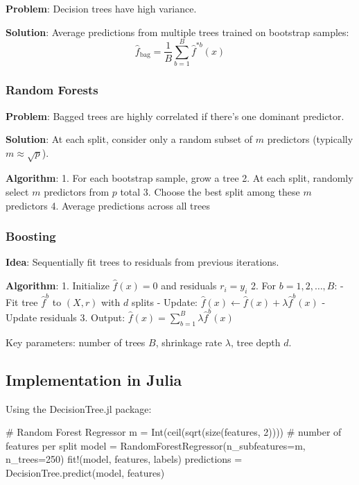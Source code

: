 \documentclass[
  letterpaper,
  DIV=11,
  numbers=noendperiod]{scrreprt}
\newenvironment{Shaded}{\begin{snugshade}}{\end{snugshade}}
\newcommand{\CommentTok}[1]{\textcolor[rgb]{0.37,0.37,0.37}{#1}}
\newcommand{\FloatTok}[1]{\textcolor[rgb]{0.68,0.00,0.00}{#1}}
\newcommand{\FunctionTok}[1]{\textcolor[rgb]{0.28,0.35,0.67}{#1}}
\newcommand{\NormalTok}[1]{\textcolor[rgb]{0.00,0.23,0.31}{#1}}
\newcommand{\OperatorTok}[1]{\textcolor[rgb]{0.37,0.37,0.37}{#1}}
\begin{document}
\textbf{Problem}: Decision trees have high variance.

\textbf{Solution}: Average predictions from multiple trees trained on
bootstrap samples: \[
\hat{f}_\text{bag} = \frac{1}{B} \sum_{b=1}^B \hat{f}^{*b}(x)
\]

\subsubsection{Random Forests}\label{random-forests}

\textbf{Problem}: Bagged trees are highly correlated if there's one
dominant predictor.

\textbf{Solution}: At each split, consider only a random subset of \(m\)
predictors (typically \(m \approx \sqrt{p}\)).

\textbf{Algorithm}: 1. For each bootstrap sample, grow a tree 2. At each
split, randomly select \(m\) predictors from \(p\) total 3. Choose the
best split among these \(m\) predictors 4. Average predictions across
all trees

\subsubsection{Boosting}\label{boosting}

\textbf{Idea}: Sequentially fit trees to residuals from previous
iterations.

\textbf{Algorithm}: 1. Initialize \(\hat{f}(x) = 0\) and residuals
\(r_i = y_i\) 2. For \(b = 1, 2, \ldots, B\): - Fit tree \(\hat{f}^b\)
to \((X, r)\) with \(d\) splits - Update:
\(\hat{f}(x) \leftarrow \hat{f}(x) + \lambda \hat{f}^b(x)\) - Update
residuals 3. Output: \(\hat{f}(x) = \sum_{b=1}^B \lambda \hat{f}^b(x)\)

Key parameters: number of trees \(B\), shrinkage rate \(\lambda\), tree
depth \(d\).

\subsection{Implementation in Julia}\label{implementation-in-julia-1}

Using the DecisionTree.jl package:

\begin{Shaded}
\begin{Highlighting}[]
\CommentTok{\# Random Forest Regressor}
\NormalTok{m }\OperatorTok{=} \FunctionTok{Int}\NormalTok{(}\FunctionTok{ceil}\NormalTok{(}\FunctionTok{sqrt}\NormalTok{(}\FunctionTok{size}\NormalTok{(features, }\FloatTok{2}\NormalTok{))))  }\CommentTok{\# number of features per split}
\NormalTok{model }\OperatorTok{=} \FunctionTok{RandomForestRegressor}\NormalTok{(n\_subfeatures}\OperatorTok{=}\NormalTok{m, n\_trees}\OperatorTok{=}\FloatTok{250}\NormalTok{)}
\FunctionTok{fit!}\NormalTok{(model, features, labels)}
\NormalTok{predictions }\OperatorTok{=}\NormalTok{ DecisionTree.}\FunctionTok{predict}\NormalTok{(model, features)}
\end{Highlighting}
\end{Shaded}
\end{document}
